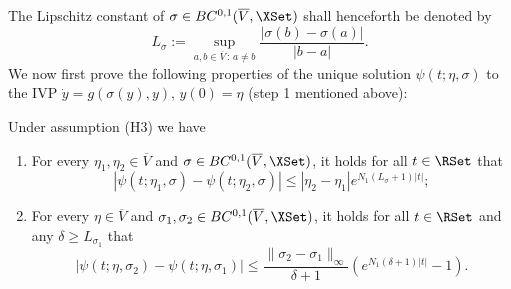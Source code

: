 \documentclass[a4paper]{siamart190516}
\begin{document}
The Lipschitz constant of $\sigma \in BC^{0,1}(\overline{V}, \XSet)$ shall henceforth be denoted by 
\[
  L_{\sigma} := \sup_{a,b \in \overline{V} \,: \, a \neq b} \frac{|\sigma(b)-\sigma(a)|}{|b-a|}.
\]
We now first prove the following properties of the unique solution $\psi(t; \eta, \sigma)$ to the IVP $\dot{y} = g(\sigma(y),y), \, y(0) = \eta$ (step 1 mentioned above):
 
 \begin{lemma}\label{lem:sol-slow-subsystem}
 Under assumption (H3) we have
  \begin{enumerate}
\item For every $\eta_1, \eta_2 \in \overline{V}$ and $\sigma \in BC^{0,1}(\overline{V}, \XSet)$, it holds for all $t \in \RSet$ that
\[
|\psi(t; \eta_1, \sigma) - \psi(t; \eta_2, \sigma) | \leq |\eta_2 - \eta_1| e^{N_1 (L_{\sigma}+1)|t|};
\]
\item For every $\eta \in \overline{V}$ and $\sigma_1, \sigma_2 \in BC^{0,1}(\overline{V}, \XSet)$, it holds for all $t \in \RSet$ and any $\delta \geq L_{\sigma_1}$   that
\[
|\psi(t; \eta, \sigma_2) - \psi(t; \eta, \sigma_1) | \leq  \frac{\| \sigma_2 - \sigma_1 \|_{\infty}}{\delta + 1} \left( e^{N_1 (\delta+1)|t|} - 1 \right).
\]
 \end{enumerate}
 \end{lemma}
 
\end{document}
